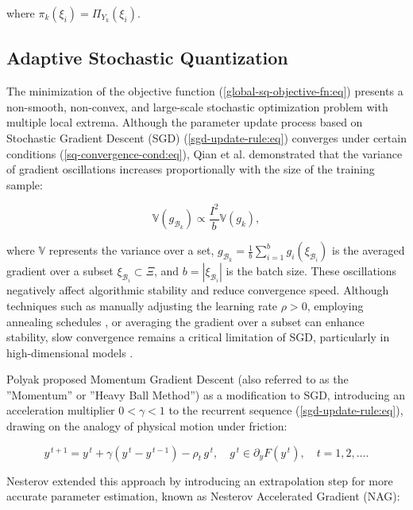 where $\pi_k(\xi_i)=\Pi_{Y_k}(\xi_i)$.

\subsection{Adaptive Stochastic Quantization} \label{adap-stoch-quant:sec}

The minimization of the objective function (\ref{global-sq-objective-fn:eq}) presents a non-smooth, non-convex, and large-scale stochastic optimization problem with multiple local extrema. Although the parameter update process based on Stochastic Gradient Descent (SGD) (\ref{sgd-update-rule:eq}) converges under certain conditions (\ref{sq-convergence-cond:eq}), Qian et al. \cite{qian2020} demonstrated that the variance of gradient oscillations increases proportionally with the size of the training sample:

\begin{equation}
    \label{sgd-oscillations:eq}
    \mathbb{V} (g_{\mathcal{B}_k}) \propto \frac{I^2}{b} \mathbb{V} (g_k),
\end{equation}

\noindent where $\mathbb{V}$ represents the variance over a set, $g_{\mathcal{B}_k} = \frac{1}{b} \sum_{i=1}^{b} g_i (\xi_{\mathcal{B}_i})$ is the averaged gradient over a subset $\xi_{\mathcal{B}_i} \subset \Xi$, and $b = | \xi_{\mathcal{B}_i} |$ is the batch size. These oscillations negatively affect algorithmic stability and reduce convergence speed. Although techniques such as manually adjusting the learning rate $\rho > 0$, employing annealing schedules \cite{Robbins_Monro_1951}, or averaging the gradient over a subset can enhance stability, slow convergence remains a critical limitation of SGD, particularly in high-dimensional models \cite{Norkin_Kozyriev_Norkin_2024}.

Polyak \cite{Poliak_1987} proposed Momentum Gradient Descent (also referred to as the ''Momentum'' or ''Heavy Ball Method'') as a modification to SGD, introducing an acceleration multiplier $0 < \gamma < 1$ to the recurrent sequence (\ref{sgd-update-rule:eq}), drawing on the analogy of physical motion under friction:

\begin{equation}
    \label{momentum-update-rule:eq}
    y^{\,t+1} = y^{\,t} + \gamma (y^{\,t} - y^{\,t-1}) - \rho_t \,g^{\,t}, \quad g^{\,t}\in \partial_y F(y^{\,t}),   \quad t = 1,2,\ldots.
\end{equation}

Nesterov \cite{nesterov1983method,walkington_2023} extended this approach by introducing an extrapolation step for more accurate parameter estimation, known as Nesterov Accelerated Gradient (NAG):

